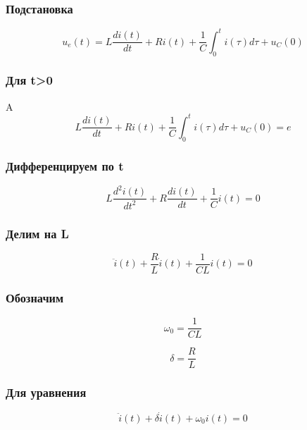 \documentclass[12pt,a4paper]{article}
\begin{document}
	\subsubsection*{Подстановка}
	
	\[u_e(t) = L\frac{di(t)}{dt} + Ri(t) + \frac{1}{C}\int_{0}^{t}i(\tau)d\tau + u_C(0)\]
	
	\subsubsection*{Для t>0}
	A
	\[L\frac{di(t)}{dt} + Ri(t) + \frac{1}{C}\int_{0}^{t}i(\tau)d\tau + u_C(0) = e\]
	
	\subsubsection*{Дифференцируем по t}
	
	\[L\frac{d^2i(t)}{dt^2} + R\frac{di(t)}{dt} + \frac{1}{C}i(t) = 0\]
	
	\subsubsection*{Делим на L}
	
	\[\ddot i(t) + \frac{R}{L} \dot i(t) + \frac{1}{CL}i(t) = 0\]
	
	\subsubsection*{Обозначим}
	
	\[\omega_0 = \frac{1}{CL}\]
	
	\[\delta =  \frac{R}{L}\]
	
	\subsubsection*{Для уравнения}
	
	\[\ddot i(t) + \delta \dot i(t) + \omega_0i(t) = 0\]
	
	
	
\end{document}
